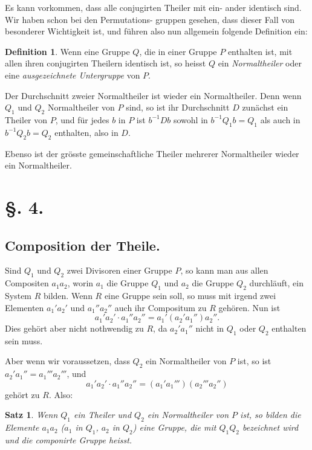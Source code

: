 \documentclass[12pt,a4paper]{article}
\theoremstyle{plain}
\newtheorem{satz}{Satz}[section]
\theoremstyle{definition}
\newtheorem{definition}{Definition}[section]
\theoremstyle{remark}
\begin{document}
Es kann vorkommen, dass alle conjugirten Theiler mit ein-
ander identisch sind. Wir haben schon bei den Permutations-
gruppen gesehen, dass dieser Fall von besonderer Wichtigkeit
ist, und führen also nun allgemein folgende Definition ein:

\begin{definition}
Wenn eine Gruppe $Q$, die in einer Gruppe $P$ enthalten
ist, mit allen ihren conjugirten Theilern identisch ist, so heisst
$Q$ ein \emph{Normaltheiler} oder eine \emph{ausgezeichnete Untergruppe} von $P$.
\end{definition}

Der Durchschnitt zweier Normaltheiler ist wieder ein
Normaltheiler. Denn wenn $Q_1$ und $Q_2$ Normaltheiler von $P$
sind, so ist ihr Durchschnitt $D$ zunächst ein Theiler von $P$,
und für jedes $b$ in $P$ ist $b^{-1}Db$ sowohl in $b^{-1}Q_1 b = Q_1$ als
auch in $b^{-1}Q_2 b = Q_2$ enthalten, also in $D$.

Ebenso ist der grösste gemeinschaftliche Theiler mehrerer
Normaltheiler wieder ein Normaltheiler.

\newpage

\section*{\S. 4.}
\subsection*{Composition der Theile.}

Sind $Q_1$ und $Q_2$ zwei Divisoren einer Gruppe $P$, so kann
man aus allen Compositen $a_1 a_2$, worin $a_1$ die Gruppe $Q_1$ und
$a_2$ die Gruppe $Q_2$ durchläuft, ein System $R$ bilden. Wenn $R$
eine Gruppe sein soll, so muss mit irgend zwei Elementen
$a_1' a_2'$ und $a_1'' a_2''$ auch ihr Compositum zu $R$ gehören. Nun ist
\[
a_1' a_2' \cdot a_1'' a_2'' = a_1' (a_2' a_1'') a_2''.
\]
Dies gehört aber nicht nothwendig zu $R$, da $a_2' a_1''$ nicht in $Q_1$
oder $Q_2$ enthalten sein muss.

Aber wenn wir voraussetzen, dass $Q_2$ ein Normaltheiler
von $P$ ist, so ist $a_2' a_1'' = a_1''' a_2'''$, und
\[
a_1' a_2' \cdot a_1'' a_2'' = (a_1' a_1''') (a_2''' a_2'')
\]
gehört zu $R$. Also:

\begin{satz}
Wenn $Q_1$ ein Theiler und $Q_2$ ein Normaltheiler von $P$
ist, so bilden die Elemente $a_1 a_2$ ($a_1$ in $Q_1$, $a_2$ in $Q_2$) eine
Gruppe, die mit $Q_1 Q_2$ bezeichnet wird und die \emph{componirte}
Gruppe heisst.
\end{satz}
\end{document}

